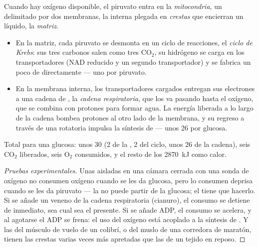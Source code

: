 \begin{proposition}\label{prop:g12:respiration-fermentation:mitochondrion}
Cuando hay oxígeno disponible, el piruvato entra en la
\emph{mitocondria}, un  delimitado por dos
membranas, la interna plegada en \emph{crestas} que encierran un
líquido, la \emph{matriz}.
\begin{itemize}
  \item En la matriz, cada piruvato se desmonta en un ciclo de
        reacciones, el \emph{ciclo de Krebs}: sus
        tres carbonos salen como tres $\mathrm{CO_2}$, su hidrógeno se
        carga en los transportadores (NAD reducido y un segundo
        transportador) y se fabrica un poco de  directamente ---
        uno por piruvato.
  \item En la membrana interna, los transportadores cargados entregan
        sus electrones a una cadena de , la \emph{cadena
        respiratoria}, que los va pasando hasta el oxígeno, que se
        combina con protones para formar agua. La energía liberada a lo
        largo de la cadena bombea protones al otro lado de la membrana,
        y su regreso a través de una  rotatoria impulsa la
        síntesis de  --- unos 26 por glucosa.
\end{itemize}
Total para una glucosa: unos 30  (2 de la , 2 del ciclo,
unos 26 de la cadena), seis $\mathrm{CO_2}$ liberados, seis
$\mathrm{O_2}$ consumidos, y el resto de los \qty{2870}{kJ} como calor.
\end{proposition}
\begin{proof}[Pruebas experimentales]
Unas  aisladas en una cámara cerrada con una sonda de
oxígeno no consumen oxígeno cuando se les da glucosa, pero lo consumen
deprisa cuando se les da piruvato --- la  no puede partir de
la glucosa; el  tiene que hacerlo. Si se añade un veneno de
la cadena respiratoria (cianuro), el consumo se detiene de inmediato,
sea cual sea el  presente. Si se añade ADP, el consumo se
acelera, y al agotarse el ADP se frena: el uso del oxígeno está
acoplado a la síntesis de . Y las  del músculo de vuelo
de un colibrí, o del muslo de una corredora de maratón, tienen las
crestas varias veces más apretadas que las de un tejido en reposo.
\end{proof}

